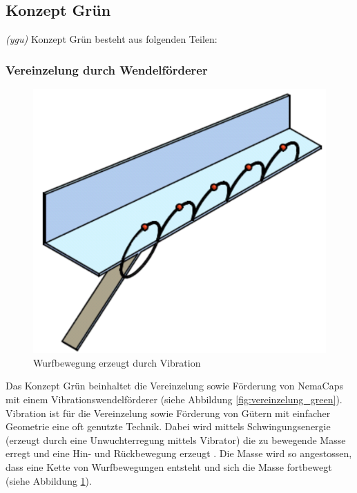 \newpage
\subsection{Konzept Grün}
\label{KonzeptGreen}
\textit{(ygu)} Konzept Grün besteht aus folgenden Teilen:

\subsubsection{Vereinzelung durch Wendelförderer}
\begin{figure}
	\includegraphics[scale=0.2]{Illustrationen/5-Konzept/foerderbewegung.png}
	\caption{Wurfbewegung erzeugt durch Vibration \protect\cite{webac}}
	\label{fig:foerderbewegung}
\end{figure}
Das Konzept Grün beinhaltet die Vereinzelung sowie Förderung von NemaCaps mit einem Vibrationswendelförderer (siehe Abbildung \ref{fig:vereinzelung_green}).
Vibration ist für die Vereinzelung sowie Förderung von Gütern mit einfacher Geometrie eine oft genutzte Technik. Dabei wird mittels Schwingungsenergie (erzeugt durch eine Unwuchterregung mittels Vibrator) die zu bewegende Masse erregt und eine Hin- und Rückbewegung erzeugt \cite{risch}. Die Masse wird so angestossen, dass eine Kette von Wurfbewegungen entsteht und sich die Masse fortbewegt (siehe Abbildung \ref{fig:foerderbewegung}).

